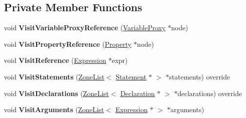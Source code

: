 \subsection*{Private Member Functions}
\begin{DoxyCompactItemize}
\item 
void {\bfseries Visit\+Variable\+Proxy\+Reference} (\hyperlink{classv8_1_1internal_1_1_variable_proxy}{Variable\+Proxy} $\ast$node)\hypertarget{classv8_1_1internal_1_1_ast_numbering_visitor_a0f27b6b047de74d801f44241eec687cc}{}\label{classv8_1_1internal_1_1_ast_numbering_visitor_a0f27b6b047de74d801f44241eec687cc}

\item 
void {\bfseries Visit\+Property\+Reference} (\hyperlink{classv8_1_1internal_1_1_property}{Property} $\ast$node)\hypertarget{classv8_1_1internal_1_1_ast_numbering_visitor_a8d0a4159db064fe88bf84a3da8166235}{}\label{classv8_1_1internal_1_1_ast_numbering_visitor_a8d0a4159db064fe88bf84a3da8166235}

\item 
void {\bfseries Visit\+Reference} (\hyperlink{classv8_1_1internal_1_1_expression}{Expression} $\ast$expr)\hypertarget{classv8_1_1internal_1_1_ast_numbering_visitor_a9a1133b54d9b0d50752daabc0a6383a6}{}\label{classv8_1_1internal_1_1_ast_numbering_visitor_a9a1133b54d9b0d50752daabc0a6383a6}

\item 
void {\bfseries Visit\+Statements} (\hyperlink{classv8_1_1internal_1_1_zone_list}{Zone\+List}$<$ \hyperlink{classv8_1_1internal_1_1_statement}{Statement} $\ast$ $>$ $\ast$statements) override\hypertarget{classv8_1_1internal_1_1_ast_numbering_visitor_a4635322ae62023c2ecf1c201777b2263}{}\label{classv8_1_1internal_1_1_ast_numbering_visitor_a4635322ae62023c2ecf1c201777b2263}

\item 
void {\bfseries Visit\+Declarations} (\hyperlink{classv8_1_1internal_1_1_zone_list}{Zone\+List}$<$ \hyperlink{classv8_1_1internal_1_1_declaration}{Declaration} $\ast$ $>$ $\ast$declarations) override\hypertarget{classv8_1_1internal_1_1_ast_numbering_visitor_a98076f4ae4468d086a87a31be5e4fe15}{}\label{classv8_1_1internal_1_1_ast_numbering_visitor_a98076f4ae4468d086a87a31be5e4fe15}

\item 
void {\bfseries Visit\+Arguments} (\hyperlink{classv8_1_1internal_1_1_zone_list}{Zone\+List}$<$ \hyperlink{classv8_1_1internal_1_1_expression}{Expression} $\ast$ $>$ $\ast$arguments)\hypertarget{classv8_1_1internal_1_1_ast_numbering_visitor_a908e71c49bcc51fb9a184b18468768db}{}\label{classv8_1_1internal_1_1_ast_numbering_visitor_a908e71c49bcc51fb9a184b18468768db}


\end{DoxyCompactItemize}
